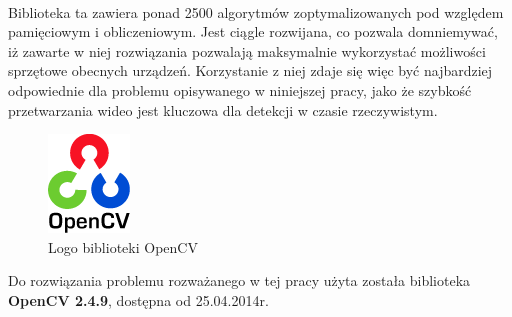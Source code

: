 \paragraph{}
Biblioteka ta zawiera ponad 2500 algorytmów zoptymalizowanych pod względem pamięciowym i obliczeniowym. Jest ciągle rozwijana, co pozwala domniemywać, iż zawarte w niej rozwiązania pozwalają maksymalnie wykorzystać możliwości sprzętowe obecnych urządzeń. Korzystanie z niej zdaje się więc być najbardziej odpowiednie dla problemu opisywanego w niniejszej pracy, jako że szybkość przetwarzania wideo jest kluczowa dla detekcji w czasie rzeczywistym.
\begin{figure}[!htb]
\centering

\includegraphics[width=82px]{img/ocv_logo}
\caption{Logo biblioteki OpenCV \cite{OpenCVLogo}}
\end{figure}

Do rozwiązania problemu rozważanego w tej pracy użyta została biblioteka \textbf{OpenCV 2.4.9}, dostępna od 25.04.2014r.